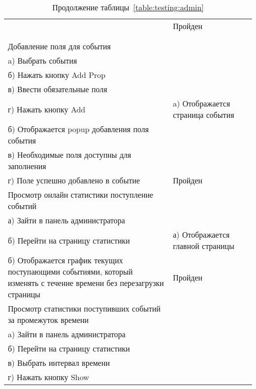 \begin{longtable}[l]{| >{\raggedright}m{}
                  | >{\raggedright}m{}
                  | >{\raggedright\arraybackslash}m{}|}
    & 

    Пройден \\ 

    \pagebreak
    \caption*{Продолжение таблицы~\ref{table:testing:admin}} \\
    \hline
    \centering 1 & \centering 2 & \centering 3 \tabularnewline
    \hline


    Добавление поля для события\\
    a) Выбрать события \\
    б) Нажать кнопку Add Prop \\
    в) Ввести обязательные поля \\
    г) Нажать кнопку Add 

    & 

    a) Отображается страница события \\
    б) Отображается popup добавления поля события \\
    в) Необходимые поля доступны для заполнения \\
    г) Поле успешно добавлено в событие 
    
    & 

    Пройден \\ \hline

    Просмотр онлайн статистики поступление событий \\
    а) Зайти в панель администратора \\
    б) Перейти на страницу статистики 
    
    & 

    а) Отображается главной страницы  \\
    б) Отображается график текущих поступающими событиями, который изменять с течение времени без перезагрузки страницы 
    
    & 

    Пройден \\

    \hline


    Просмотр статистики поступивших событий за промежуток времени \\
    a) Зайти в панель администратора \\
    б) Перейти на страницу статистики \\
    в) Выбрать интервал времени \\
    г) Нажать кнопку Show 
    

\end{longtable}
